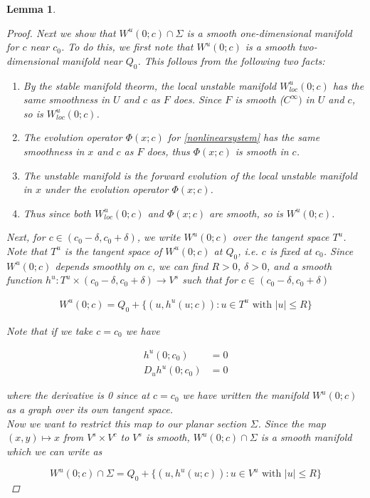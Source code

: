 \documentclass[12pt]{article}
\newtheorem{lemma}{Lemma}
\begin{document}
\begin{lemma}
\begin{proof}
Next we show that $W^u(0; c) \cap \Sigma$ is a smooth one-dimensional manifold for $c$ near $c_0$. To do this, we first note that $W^u(0; c)$ is a smooth two-dimensional manifold near $Q_0$. This follows from the following two facts:
\begin{enumerate} 
\item By the stable manifold theorm, the local unstable manifold $W^u_{loc}(0; c)$ has the same smoothness in $U$ and $c$ as $F$ does. Since $F$ is smooth ($C^\infty)$ in $U$ and $c$, so is $W^u_{loc}(0; c)$.
\item The evolution operator $\Phi(x; c)$ for \eqref{nonlinearsystem} has the same smoothness in $x$ and $c$ as $F$ does, thus $\Phi(x; c)$ is smooth in $c$.
\item The unstable manifold is the forward evolution of the local unstable manifold in $x$ under the evolution operator $\Phi(x; c)$.
\item Thus since both $W^u_{loc}(0; c)$ and $\Phi(x; c)$ are smooth, so is $W^u(0; c)$.
\end{enumerate}

Next, for $c \in (c_0 - \delta, c_0 + \delta)$, we write $W^u(0; c)$ over the tangent space $T^u$. Note that $T^u$ is the tangent space of $W^u(0; c)$ at $Q_0$, i.e. $c$ is fixed at $c_0$. Since $W^u(0; c)$ depends smoothly on $c$, we can find $R > 0$, $\delta > 0$, and a smooth function $h^u: T^u \times (c_0 - \delta, c_0 + \delta) \rightarrow V^s$ such that for $c \in (c_0 - \delta, c_0 + \delta)$

\begin{align*}
W^u(0; c) = Q_0 + \{ (u, h^u(u; c)) : u \in T^u \text{ with } |u| \leq R \}
\end{align*}

Note that if we take $c = c_0$ we have 

\begin{align*}
h^u(0; c_0) &= 0 \\
D_u h^u(0; c_0) &= 0
\end{align*}

where the derivative is 0 since at $c = c_0$ we have written the manifold $W^u(0; c)$ as a graph over its own tangent space. \\

Now we want to restrict this map to our planar section $\Sigma$. Since the map $(x, y) \mapsto x$ from $V^s \times V^c$ to $V^s$ is smooth, $W^u(0; c) \cap \Sigma$ is a smooth manifold which we can write as

\[
W^u(0; c) \cap \Sigma = Q_0 + \{ (u, h^u(u; c)) : u \in V^u \text{ with } |u| \leq R \}
\]


\end{proof}
\end{lemma}
\end{document}
